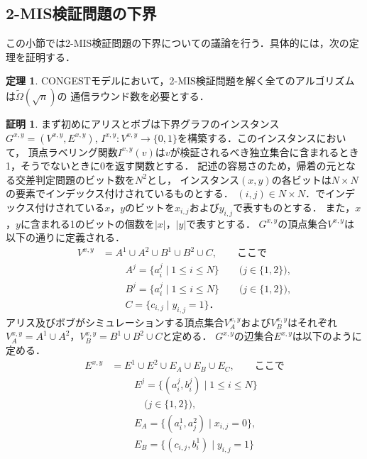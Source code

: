 \documentclass[11pt,a4paper]{jarticle}
\newcommand{\CONGEST}{\textsf{CONGEST}}
\theoremstyle{definition}
\newtheorem{theorem}{定理}[section]
\newtheorem*{prf*}{証明}
\begin{document}
\subsection{2-MIS検証問題の下界}
この小節では2-MIS検証問題の下界についての議論を行う．具体的には，次の定理を証明する．
\begin{theorem}
{\CONGEST}モデルにおいて，2-MIS検証問題を解く全てのアルゴリズムは$\tilde{\Omega} (\sqrt{n})$の
通信ラウンド数を必要とする．
\end{theorem}
\begin{prf*}
まず初めにアリスとボブは下界グラフのインスタンス$G^{x,y} = (V^{x,y}, E^{x,y})$, 
$I^{x,y} : V^{x,y} \to \{0, 1\}$を構築する．このインスタンスにおいて，
頂点ラベリング関数$I^{x,y}(v)$は$v$が検証されるべき独立集合に含まれるとき1，そうでないときに0を返す関数とする．
記述の容易さのため，帰着の元となる交差判定問題のビット数を$N^2$とし，
インスタンス$(x, y)$の各ビットは$N\times N$の要素でインデックス付けされているものとする．
$(i, j) \in N \times N$．でインデックス付けされている$x$，$y$のビットを$x_{i,j}$および$y_{i,j}$で表すものとする．
また，$x$，$y$に含まれる1のビットの個数を$|x|$，$|y|$で表すとする．
$G^{x,y}$の頂点集合$V^{x,y}$は以下の通りに定義される．
\begin{align*}
V^{x,y} &= A^{1} \cup A^{2} \cup B^{1} \cup B^{2} \cup C, \quad \quad \text{ここで}\\
&\phantom{=} \quad A^{j} = \{a^{j}_{i} \mid 1\leq i \leq N\} \quad \quad \text{($j \in \{1, 2\}$)}, \\
&\phantom{=} \quad B^{j} = \{a^{j}_{i} \mid 1\leq i \leq N\} \quad \quad \text{($j \in \{1, 2\}$)}, \\
&\phantom{=} \quad C = \{c_{i,j} \mid y_{i,j} = 1\}．
\end{align*}
アリス及びボブがシミュレーションする頂点集合$V^{x,y}_{A}$および$V^{x,y}_{B}$はそれぞれ
$V^{x,y}_{A} = A^{1} \cup A^{2}$，$V^{x,y}_{B} = B^{1} \cup B^{2} \cup C$と定める．
$G^{x,y}$の辺集合$E^{x,y}$は以下のように定める．
\begin{align*}
E^{x,y} &= E^{1} \cup E^{2} \cup E_{A} \cup E_{B} \cup E_{C}, \quad \quad \text{ここで}\\
&\phantom{=} \quad E^{j} = \{(a^{j}_{i}, b^{j}_{i}) \mid 1\leq i \leq N\} \\
&\phantom{=} \quad \quad \text{($j \in \{1, 2\}$)}, \\
&\phantom{=} \quad E_{A} = \{(a^{1}_{i},a^{2}_{j}) \mid x_{i,j}=0\}, \\
&\phantom{=} \quad E_{B} = \{(c_{i,j},b^{1}_{i}) \mid y_{i,j}=1\} \\

\end{align*}
\end{prf*}
\end{document}
